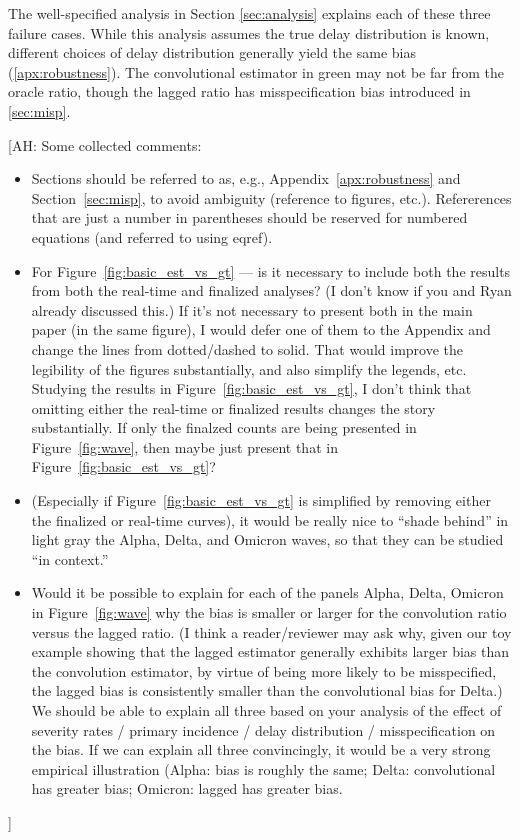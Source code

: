 \documentclass{article}
\newcommand{\ahcomment}[1]{{\color{red}[AH: #1]}}
\begin{document}
The well-specified analysis in Section \ref{sec:analysis} explains each of these three failure cases. While this analysis assumes the true delay distribution is known, different choices of delay distribution generally yield the same bias (\ref{apx:robustness}). The convolutional estimator in green may not be far from the oracle ratio, though the lagged ratio has misspecification bias introduced in \ref{sec:misp}. 
\ahcomment{
  Some collected comments:
  \begin{itemize}
    \item Sections should be referred to as, e.g.,
      Appendix~\ref{apx:robustness} and Section~\ref{sec:misp}, to avoid
      ambiguity (reference to figures, etc.).  Refererences that are just a
      number in parentheses should be reserved for numbered equations (and
      referred to using eqref).
    \item For Figure~\ref{fig:basic_est_vs_gt} --- is it necessary to include
      both the results from both the real-time and finalized analyses?
      (I don't know if you and Ryan already discussed this.)  If it's not
      necessary to present both in the main paper (in the same figure), I would
      defer one of them to the Appendix and change the lines from dotted/dashed
      to solid.  That would improve the legibility of the figures
      substantially, and also simplify the legends, etc.  Studying the results
      in Figure~\ref{fig:basic_est_vs_gt}, I don't think that omitting either
      the real-time or finalized results changes the story substantially.
      If only the finalzed counts are being presented in Figure~\ref{fig:wave},
      then maybe just present that in Figure~\ref{fig:basic_est_vs_gt}?
    \item (Especially if Figure~\ref{fig:basic_est_vs_gt} is simplified by
      removing either the finalized or real-time curves), it would be really
      nice to ``shade behind'' in light gray the Alpha, Delta, and Omicron
      waves, so that they can be studied ``in context.''
    \item Would it be possible to explain for each of the panels Alpha,
      Delta, Omicron in Figure~\ref{fig:wave} why the bias is smaller or
      larger for the convolution ratio versus the lagged ratio.  (I think
      a reader/reviewer may ask why, given our toy example showing that
      the lagged estimator generally exhibits larger bias than the convolution
      estimator, by virtue of being more likely to be misspecified, the
      lagged bias is consistently smaller than the convolutional bias for
      Delta.)  We should be able to explain all three based on your analysis
      of the effect of severity rates / primary incidence / delay distribution
      / misspecification on the bias.  If we can explain all three
      convincingly, it would be a very strong empirical illustration (Alpha:
      bias is roughly the same; Delta: convolutional has greater bias;
      Omicron: lagged has greater bias.
  \end{itemize}
}
\end{document}
